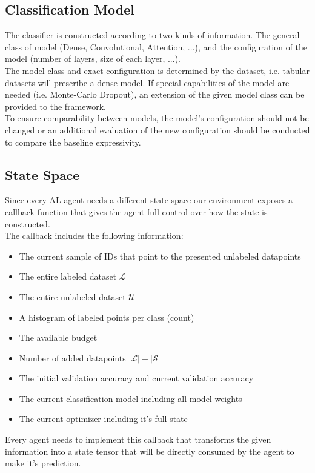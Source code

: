 \documentclass[]{article}
\begin{document}
\subsection{Classification Model}
The classifier is constructed according to two kinds of information.
The general class of model (Dense, Convolutional, Attention, ...), and the configuration of the model (number of layers, size of each layer, ...). \\
The model class and exact configuration is determined by the dataset, i.e. tabular datasets will prescribe a dense model.
If special capabilities of the model are needed (i.e. Monte-Carlo Dropout), an extension of the given model class can be provided to the framework. \\ [1mm]
To ensure comparability between models, the model's configuration should not be changed or an additional evaluation of the new configuration should be conducted to compare the baseline expressivity.

\subsection{State Space}
Since every AL agent needs a different state space our environment exposes a callback-function that gives the agent full control over how the state is constructed. \\ [1mm]
The callback includes the following information:
\begin{itemize}
	\item The current sample of IDs that point to the presented unlabeled datapoints
	\item The entire labeled dataset $\mathcal{L}$
	\item The entire unlabeled dataset $\mathcal{U}$
	\item A histogram of labeled points per class (count)
	\item The available budget
	\item Number of added datapoints $|\mathcal{L}| - |\mathcal{S}|$
	\item The initial validation accuracy and current validation accuracy
	\item The current classification model including all model weights
	\item The current optimizer including it's full state
\end{itemize}
Every agent needs to implement this callback that transforms the given information into a state tensor that will be directly consumed by the agent to make it's prediction.
\end{document}
